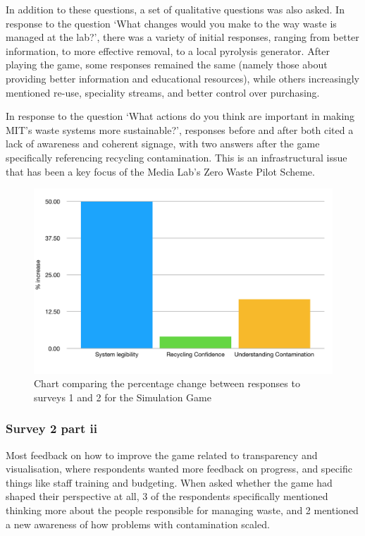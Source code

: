 \documentclass[nofonts,nols,justified,nobib]{tufte-book}
\begin{document}
In addition to these questions, a set of qualitative questions was also asked. In response to the question `What changes would you make to the way waste is managed at the lab?', there was a variety of initial responses, ranging from better information, to more effective removal, to a local pyrolysis generator. After playing the game, some responses remained the same (namely those about providing better information and educational resources), while others increasingly mentioned re-use, speciality streams, and better control over purchasing.

In response to the question `What actions do you think are important in making MIT's waste systems more sustainable?', responses before and after both cited a lack of awareness and coherent signage, with two answers after the game specifically referencing recycling contamination. This is an infrastructural issue that has been a key focus of the Media Lab's Zero Waste Pilot Scheme.


\begin{figure}
  \caption{Chart comparing the percentage change between responses to surveys 1 and 2 for the Simulation Game}
  \includegraphics[width=1\linewidth]{img/4/attitude-changes-sim.png}
\end{figure}


\subsubsection*{Survey 2 part ii}
Most feedback on how to improve the game related to transparency and visualisation, where respondents wanted more feedback on progress, and specific things like staff training and budgeting. When asked whether the game had shaped their perspective at all, 3 of the respondents specifically mentioned thinking more about the people responsible for managing waste, and 2 mentioned a new awareness of how problems with contamination scaled.
\end{document}
